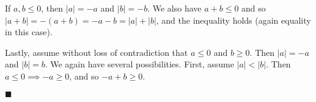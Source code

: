 \documentclass[12pt]{article}
\renewcommand{\qed}{\hfill$\blacksquare$}
\renewenvironment{proof}{\begin{addmargin}[1em]{0em}\begin{newproof}}{\end{newproof}\end{addmargin}\qed}
\begin{document}
\begin{proof}
\begin{itemize}
	If $a,b \leq 0$, then  $\left|a\right| = -a $ and  $\left|b\right| = -b$. We also have $a+b \leq 0$ and so $\left|a+b\right| = -\left(a+b\right) = -a - b = \left|a\right|+\left|b\right|$, and the inequality holds (again equality in this case).
	
	Lastly, assume without loss of contradiction that $a\leq 0$ and $b\geq 0$. Then  $\left|a\right| = -a$ and  $\left|b\right| = b$. We again have several possibilities. First, assume $\left|a\right| < \left|b\right|$. Then $a\leq 0 \implies -a \geq 0$, and so $-a + b \geq 0$. 
\end{itemize}
\end{proof}








\end{document}
